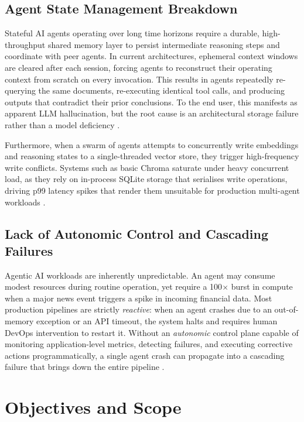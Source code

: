 \documentclass[12pt, a4paper]{report}
\begin{document}
\subsection{Agent State Management Breakdown}
\label{ssec:statebreakdown}

Stateful AI agents operating over long time horizons require a durable, high-throughput
shared memory layer to persist intermediate reasoning steps and coordinate with peer
agents. In current architectures, ephemeral context windows are cleared after each
session, forcing agents to reconstruct their operating context from scratch on every
invocation. This results in agents repeatedly re-querying the same documents, re-executing
identical tool calls, and producing outputs that contradict their prior conclusions. To
the end user, this manifests as apparent LLM hallucination, but the root cause is an
architectural storage failure rather than a model deficiency \citep{wu2023autogen,Bornstein2023}.

Furthermore, when a swarm of agents attempts to concurrently write embeddings and
reasoning states to a single-threaded vector store, they trigger high-frequency write
conflicts. Systems such as basic Chroma saturate under heavy concurrent load, as they
rely on in-process SQLite storage that serialises write operations, driving p99 latency
spikes that render them unsuitable for production multi-agent workloads
\citep{agentframeworks2025empirical}.

\subsection{Lack of Autonomic Control and Cascading Failures}
\label{ssec:cascading}

Agentic AI workloads are inherently unpredictable. An agent may consume modest resources
during routine operation, yet require a 100$\times$ burst in compute when a major news
event triggers a spike in incoming financial data.
Most production pipelines are strictly \emph{reactive}: when an agent crashes due to an
out-of-memory exception or an API timeout, the system halts and requires human DevOps
intervention to restart it.
Without an \emph{autonomic} control plane capable of monitoring application-level
metrics, detecting failures, and executing corrective actions programmatically, a single
agent crash can propagate into a cascading failure that brings down the entire pipeline
\citep{kephart2003}.

\section{Objectives and Scope}
\label{sec:objectives}
\end{document}
